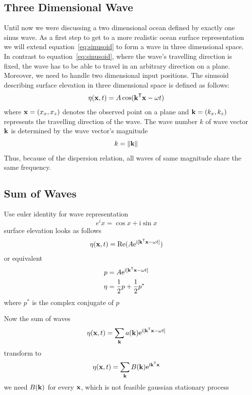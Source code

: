 \subsection{Three Dimensional Wave}
Until now we were discussing a two dimensional ocean defined by exactly one sinus wave. As a first
step to get to a more realistic ocean surface representation we will extend equation~\ref{eq:sinusoid}
to form a wave in three dimensional space. In contrast to equation~\ref{eq:sinusoid}, where the wave's
travelling direction is fixed, the wave has to be able to travel in an arbitrary direction on a plane.
Moreover, we need to handle two dimensional input positions. The sinusoid describing surface elevation
in three dimensional space is defined as follows:
\begin{equation}
 \eta(\mathbf{x}, t) = A\cos(\mathbf{k}^{\mathsf{T}}\mathbf{x} - \omega t)
\end{equation}
where $\mathbf{x} = (x_x, x_z)$ denotes the observed point on a plane and $\mathbf{k} = (k_x, k_z)$ represents
the travelling direction of the wave. The wave number $k$ of wave vector $\mathbf{k}$ is determined by the wave vector's
magnitude
\begin{equation}
 k = \lVert\mathbf{k}\rVert
\end{equation}
Thus, because of the dispersion relation, all waves of same magnitude share the same frequency.

\subsection{Sum of Waves}
Use euler identity for wave representation
\begin{equation}
 e^ix = \cos{x} + \mathrm{i}\sin{x}
\end{equation}
%
surface elevation looks as follows
%
\begin{equation}
 \eta(\mathbf{x}, t) = \mathrm{Re}(A\mathrm{e}^{\mathrm{i}[\mathbf{k}^{\mathsf{T}}\mathbf{x} - {\omega}t]})
\end{equation}
%
or equivalent
%
\begin{align}
 p &= A\mathrm{e}^{\mathrm{i}[\mathbf{k}^{\mathsf{T}}\mathbf{x} - {\omega}t]} \\
 \eta &= \frac{1}{2}p + \frac{1}{2}p^*
\end{align}
where $p^*$ is the complex conjugate of $p$

Now the sum of waves
%
\begin{equation}
 \eta(\mathbf{x}, t) = \sum_{\mathbf{k}}a(\mathbf{k})\mathrm{e}^{\mathrm{i}[\mathbf{k}^{\mathsf{T}}\mathbf{x} - {\omega}t]}
\end{equation}
%
transform to
\begin{equation}
 \eta(\mathbf{x}, t) = \sum_{\mathbf{k}}B(\mathbf{k})\mathrm{e}^{\mathrm{i}\mathbf{k}^{\mathsf{T}}\mathbf{x}}
\end{equation}
%
we need $B(\mathbf{k})$ for every $\mathbf{x}$, which is not feasible
%
gaussian stationary process


